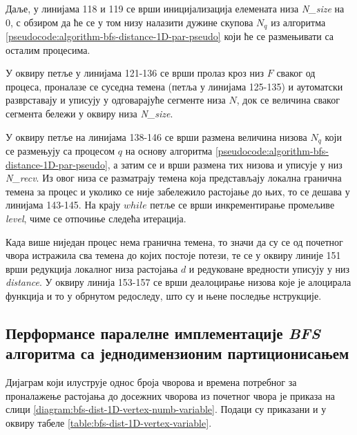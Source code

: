 \par
Даље, у линијама 118 и 119 се врши иницијализација елемената низа \textit{N\_size} на 0, с обзиром да ће се у том низу налазити дужине скупова $N_q$ из алгоритма \ref{pseudocode:algorithm-bfs-distance-1D-par-pseudo} који ће се размењивати са осталим процесима.

\par
У оквиру петље у линијама 121-136 се врши пролаз кроз низ $F$ сваког од процеса, проналазе се суседна темена (петља у линијама 125-135) и аутоматски разврставају и уписују у одговарајуће сегменте низа $N$, док се величина сваког сегмента бележи у оквиру низа \textit{N\_size}.

\par
У оквиру петље на линијама 138-146 се врши размена величина низова $N_q$ који се размењују са процесом $q$ на основу алгоритма \ref{pseudocode:algorithm-bfs-distance-1D-par-pseudo}, а затим се и врши размена тих низова и уписује у низ \textit{N\_recv}. Из овог низа се разматрају темена која представљају локална гранична темена за процес и уколико се није забележило растојање до њих, то се дешава у линијама 143-145. На крају $while$ петље се врши инкрементирање промељиве \textit{level}, чиме се отпочиње следећа итерација.

\par
Када више ниједан процес нема гранична темена, то значи да су се од почетног чвора истражила сва темена до којих постоје потези, те се у оквиру линије 151 врши редукција локалног низа растојања $d$ и редуковане вредности уписују у низ \textit{distance}. У оквиру линија 153-157 се врши деалоцирање низова које је алоцирала функција и то у обрнутом редоследу, што су и њене последње нструкције.

\subsection{Перформансе паралелне имплементације \textit{BFS} алгоритма са једнодимензионим партиционисањем}
Дијаграм који илуструје однос броја чворова и времена потребног за проналажење растојања до досежних чворова из почетног чвора је приказа на слици \ref{diagram:bfs-dist-1D-vertex-numb-variable}. Подаци су приказани и у оквиру табеле \ref{table:bfs-dist-1D-vertex-variable}.

